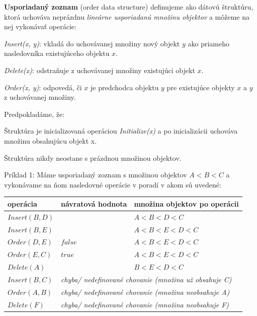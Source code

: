 \documentclass[
  digital,     %
  oneside,     %
  nosansbold,  %
  nocolorbold, %
  lof,         %
  lot,         %
]{fithesis4}
\begin{document}
\textbf{Usporiadaný zoznam} (order data structure) definujeme ako dátovú štruktúru, ktorá uchováva neprázdnu \textit{lineárne usporiadanú množinu objektov} a môžeme na nej vykonávať operácie:
\begin{compactenum}
    \item \textit{Insert(x, y)}: vkladá do uchovávanej množiny nový objekt $y$ ako priameho nasledovníka existujúceho objektu $x$.

    \item \textit{Delete(x)}: odstraňuje z uchovávanej množiny existujúci objekt $x$.
    \item \textit{Order(x, y)}: odpovedá, či $x$ je predchodca objektu $y$ pre existujúce objekty $x$ a $y$ z uchovávanej množiny.
\end{compactenum}
Predpokladáme, že:
\begin{compactitem}
    \item Štruktúra je inicializovaná operáciou \textit{Initialize(x)} a po inicializácii uchováva množinu obsahujúcu objekt x.
    \item Štruktúra nikdy neostane s prázdnou množinou objektov.\\
\end{compactitem}

Príklad 1:
Máme usporiadaný zoznam s množinou objektov $A < B < C$ a vykonávame na ňom nasledovné operácie v poradí v akom sú uvedené:\\
\begin{table}
\begin{tabularx}{\textwidth}{| l | l | l |}
    operácia & návratová hodnota & množina objektov po operácii \\
    \midrule
    $Insert(B, D)$ &  & $A < B < D < C$\\
    $Insert(B, E)$ &  & $A < B < E < D < C$\\
    $Order(D, E)$ & $false$ & $A < B < E < D < C$\\
    $Order(E, C)$ & $true$ & $A < B < E < D < C$\\
    $Delete(A)$ &  & $B < E < D < C$\\
    $Insert(B, C)$ & \multicolumn{2}{l|}{\textit{chyba/ nedefinované chovanie (množina už obsahuje C)}}\\
    $Order(A, B)$ & \multicolumn{2}{l|}{\textit{chyba/ nedefinované chovanie (množina neobsahuje A)}}\\
    $Delete(F)$ & \multicolumn{2}{l|}{\textit{chyba/ nedefinované chovanie (množina neobsahuje F)}}\\
  \end{tabularx}
\end{table}
\end{document}
